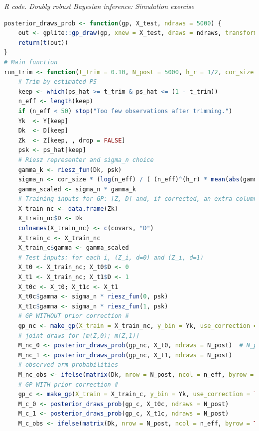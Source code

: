 \begin{enumerate}[leftmargin=*]
\begin{tcolorbox}[enhanced,width=4.67in,center upper,
fontupper=\large\bfseries,drop shadow southwest,sharp corners]
\textit{R code. Doubly robust Bayesian inference: Simulation exercise}
\begin{VF}
\begin{lstlisting}[language=R]	
posterior_draws_prob <- function(gp, X_test, ndraws = 5000) {
	out <- gplite::gp_draw(gp, xnew = X_test, draws = ndraws, transform = TRUE, target = FALSE, jitter = 1e-6)
	return(t(out))
}
# Main function
run_trim <- function(t_trim = 0.10, N_post = 5000, h_r = 1/2, cor_size = 1) {
	# Trim by estimated PS
	keep <- which(ps_hat >= t_trim & ps_hat <= (1 - t_trim))
	n_eff <- length(keep)
	if (n_eff < 50) stop("Too few observations after trimming.")
	Yk  <- Y[keep]
	Dk  <- D[keep]
	Zk  <- Z[keep, , drop = FALSE]
	psk <- ps_hat[keep]
	# Riesz representer and sigma_n choice
	gamma_k <- riesz_fun(Dk, psk)
	sigma_n <- cor_size * (log(n_eff) / ( (n_eff)^(h_r) * mean(abs(gamma_k)) ))
	gamma_scaled <- sigma_n * gamma_k
	# Training inputs for GP: [Z, D] and, if corrected, an extra column 'gamma'
	X_train_nc <- data.frame(Zk)
	X_train_nc$D <- Dk
	colnames(X_train_nc) <- c(covars, "D")
	X_train_c <- X_train_nc
	X_train_c$gamma <- gamma_scaled
	# Test inputs: for each i, (Z_i, d=0) and (Z_i, d=1)
	X_t0 <- X_train_nc; X_t0$D <- 0
	X_t1 <- X_train_nc; X_t1$D <- 1
	X_t0c <- X_t0; X_t1c <- X_t1
	X_t0c$gamma <- sigma_n * riesz_fun(0, psk)   
	X_t1c$gamma <- sigma_n * riesz_fun(1, psk) 
	# GP WITHOUT prior correction #
	gp_nc <- make_gp(X_train = X_train_nc, y_bin = Yk, use_correction = FALSE)
	# joint draws for [m(Z,0); m(Z,1)]
	M_nc_0 <- posterior_draws_prob(gp_nc, X_t0, ndraws = N_post)  # N_post x n_eff
	M_nc_1 <- posterior_draws_prob(gp_nc, X_t1, ndraws = N_post)
	# observed arm probabilities
	M_nc_obs <- ifelse(matrix(Dk, nrow = N_post, ncol = n_eff, byrow = TRUE) == 1, M_nc_1, M_nc_0)
	# GP WITH prior correction #
	gp_c <- make_gp(X_train = X_train_c, y_bin = Yk, use_correction = TRUE, gamma_scaled = gamma_scaled)
	M_c_0 <- posterior_draws_prob(gp_c, X_t0c, ndraws = N_post)
	M_c_1 <- posterior_draws_prob(gp_c, X_t1c, ndraws = N_post)
	M_c_obs <- ifelse(matrix(Dk, nrow = N_post, ncol = n_eff, byrow = TRUE) == 1, M_c_1, M_c_0)
\end{lstlisting}
\end{VF}
\end{tcolorbox} 


\end{enumerate}
